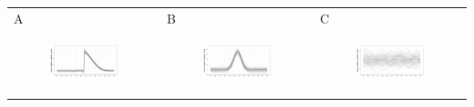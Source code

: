 \documentclass[11pt]{article}
\begin{document}
\begin{suppfigure}[ht]
	\begin{tabular}{lll}
	A&B&C\\
	\begin{subfigure}[t]{0.30\linewidth}
		\centering
		\includegraphics[width=1\linewidth]{figs/supp-figure-9a.pdf} 
	\end{subfigure}&
	\begin{subfigure}[t]{0.30\linewidth}
		\centering
		\includegraphics[width=1\linewidth]{figs/supp-figure-9b.pdf}
	\end{subfigure}&
	\begin{subfigure}[t]{0.30\linewidth}
		\centering
		\includegraphics[width=1\linewidth]{figs/supp-figure-9c.pdf}

\end{subfigure}
\end{tabular}
\end{suppfigure}
\end{document}
